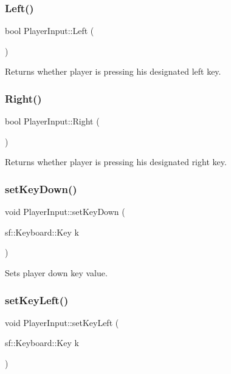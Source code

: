 \subsubsection{\texorpdfstring{Left()}{Left()}}
{\footnotesize\ttfamily bool Player\+Input\+::\+Left (\begin{DoxyParamCaption}{ }\end{DoxyParamCaption})}

Returns whether player is pressing his designated left key. \hypertarget{classPlayerInput_aa9aa970dfc19149b06ff07d956a1cd93}{}\label{classPlayerInput_aa9aa970dfc19149b06ff07d956a1cd93} 
\subsubsection{\texorpdfstring{Right()}{Right()}}
{\footnotesize\ttfamily bool Player\+Input\+::\+Right (\begin{DoxyParamCaption}{ }\end{DoxyParamCaption})}

Returns whether player is pressing his designated right key. \hypertarget{classPlayerInput_aef9ce827dd9c97f7657e6a53188d63ae}{}\label{classPlayerInput_aef9ce827dd9c97f7657e6a53188d63ae} 
\subsubsection{\texorpdfstring{set\+Key\+Down()}{setKeyDown()}}
{\footnotesize\ttfamily void Player\+Input\+::set\+Key\+Down (\begin{DoxyParamCaption}\item[{sf\+::\+Keyboard\+::\+Key}]{k }\end{DoxyParamCaption})}

Sets player down key value. \hypertarget{classPlayerInput_a3025371e730b36a0ae1cb6ec7391e7f8}{}\label{classPlayerInput_a3025371e730b36a0ae1cb6ec7391e7f8} 
\subsubsection{\texorpdfstring{set\+Key\+Left()}{setKeyLeft()}}
{\footnotesize\ttfamily void Player\+Input\+::set\+Key\+Left (\begin{DoxyParamCaption}\item[{sf\+::\+Keyboard\+::\+Key}]{k }\end{DoxyParamCaption})}

